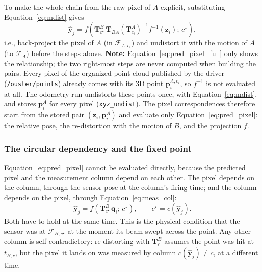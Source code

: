 To make the whole chain from the raw pixel of $A$ explicit, substituting Equation~\eqref{eq:mdist} gives
\begin{equation}
    \label{eq:pred_pixel_full}
    \hat{\mathbf{y}}_j = f\left(\mathbf{T}^{B}_{c^{\star}}\,\mathbf{T}_{BA}\left(\mathbf{T}^{A}_{c_i}\right)^{-1} f^{-1}(\mathbf{z}_i);\, c^{\star}\right),
\end{equation}
i.e., back-project the pixel of $A$ (in $\mathcal{F}_{A,c_i}$) and undistort it with the motion of $A$ (to $\mathcal{F}_{A}$) before the steps above. \textbf{Note:} Equation~\eqref{eq:pred_pixel_full} only shows the relationship; the two right-most steps are never computed when building the pairs. Every pixel of the organized point cloud published by the driver (\texttt{/ouster/points}) already comes with its 3D point $\mathbf{p}_i^{A,c_i}$, so $f^{-1}$ is not evaluated at all. The odometry run undistorts these points once, with Equation~\eqref{eq:mdist}, and stores $\mathbf{p}_i^{A}$ for every pixel (\texttt{xyz\_undist}). The pixel correspondences therefore start from the stored pair $(\mathbf{z}_i, \mathbf{p}_i^{A})$ and evaluate only Equation~\eqref{eq:pred_pixel}: the relative pose, the re-distortion with the motion of $B$, and the projection $f$.

\subsubsection{The circular dependency and the fixed point}
\label{sec:fixed_point}
Equation~\eqref{eq:pred_pixel} cannot be evaluated directly, because the predicted pixel and the measurement column depend on each other. The pixel depends on the column, through the sensor pose at the column's firing time; and the column depends on the pixel, through Equation~\eqref{eq:meas_col}:
\begin{equation}
    \label{eq:fixed_point}
    \hat{\mathbf{y}}_j = f\left(\mathbf{T}^{B}_{c^{\star}}\,\mathbf{q}_i;\, c^{\star}\right), \qquad
    c^{\star} = c\left(\hat{\mathbf{y}}_j\right).
\end{equation}
Both have to hold at the same time. This is the physical condition that the sensor was at $\mathcal{F}_{B,c^{\star}}$ at the moment its beam swept across the point. Any other column is self-contradictory: re-distorting with $\mathbf{T}^{B}_{c}$ assumes the point was hit at $t_{B,c}$, but the pixel it lands on was measured by column $c(\hat{\mathbf{y}}_j) \ne c$, at a different time.

